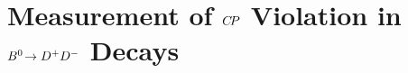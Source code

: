 
\chapter[Measurement of \texorpdfstring{$\CP$}{CP} Violation in \texorpdfstring{$\BdToDD$}{Bd2DD} Decays]{Measurement of \texorpdfstring{$\CP$}{CP} Violation in \texorpdfstring{$\BdToDD$}{Bd2DD} Decays}
\label{sec:b02dd}








